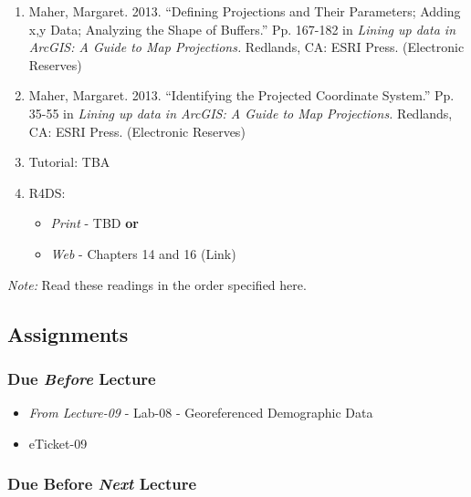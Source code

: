 \documentclass[]{book}
\providecommand{\tightlist}{%
  \setlength{\itemsep}{0pt}\setlength{\parskip}{0pt}}
\begin{document}
\begin{enumerate}
\def\labelenumi{\arabic{enumi}.}
\tightlist
\item
  Maher, Margaret. 2013. ``Defining Projections and Their Parameters; Adding x,y Data; Analyzing the Shape of Buffers.'' Pp. 167-182 in \emph{Lining up data in ArcGIS: A Guide to Map Projections.} Redlands, CA: ESRI Press. (Electronic Reserves)
\item
  Maher, Margaret. 2013. ``Identifying the Projected Coordinate System.'' Pp. 35-55 in \emph{Lining up data in ArcGIS: A Guide to Map Projections.} Redlands, CA: ESRI Press. (Electronic Reserves)
\item
  Tutorial: TBA
\item
  R4DS:

  \begin{itemize}
  \tightlist
  \item
    \emph{Print} - TBD \textbf{or}
  \item
    \emph{Web} - Chapters 14 and 16 (Link)
  \end{itemize}
\end{enumerate}

\emph{Note:} Read these readings in the order specified here.

\hypertarget{assignments-11}{%
\subsection*{Assignments}\label{assignments-11}}

\hypertarget{due-before-lecture-9}{%
\subsubsection*{\texorpdfstring{Due \emph{Before} Lecture}{Due Before Lecture}}\label{due-before-lecture-9}}

\begin{itemize}
\tightlist
\item
  \emph{From Lecture-09} - Lab-08 - Georeferenced Demographic Data
\item
  eTicket-09
\end{itemize}

\hypertarget{due-before-next-lecture-8}{%
\subsubsection*{\texorpdfstring{Due Before \emph{Next} Lecture}{Due Before Next Lecture}}\label{due-before-next-lecture-8}}
\end{document}
